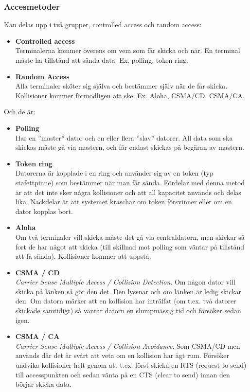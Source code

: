 \documentclass[11pt]{article}
\begin{document}
\subsubsection{Accesmetoder}
Kan delas upp i två grupper, controlled access och random access:
\begin{itemize}
\item{\textbf{Controlled access} \\
	Terminalerna kommer överens om vem som får skicka och när. En terminal måste ha tillstånd att sända data. Ex. polling, token ring.}
\item{\textbf{Random Access} \\
	Alla terminaler sköter sig själva och bestämmer själv när de får skicka. Kollisioner kommer förmodligen att ske. Ex. Aloha, CSMA/CD, CSMA/CA.}
\end{itemize}
Och de är:
\begin{itemize}
\item{\textbf{Polling} \\
	Har en ''master'' dator och en eller flera ''slav'' datorer. All data som ska skickas måste gå via mastern, och får endast skickas på begäran av mastern.}
\item{\textbf{Token ring} \\
	Datorerna är kopplade i en ring och använder sig av en token (typ stafettpinne) som bestämmer när man får sända. Fördelar med denna metod är att det inte sker några kollisioner och att all kapacitet används och delas lika. Nackdelar är att systemet kraschar om token försvinner eller om en dator kopplas bort.}
\item{\textbf{Aloha} \\
	Om två terminaler vill skicka måste det gå via centraldatorn, men skickar så fort de har något att skicka (till skillnad mot polling som väntar på tillstånd att få sända). Kollisioner kommer att uppstå.}
\item{\textbf{CSMA / CD} \\
	\emph{Carrier Sense Multiple Access / Collision Detection}. Om någon dator vill skicka på länken så gör den det. Den lyssnar och om länken är ledig skickar den. Om datorn märker att en kollision har inträffat (om t.ex. två datorer skickade samtidigt) så väntar datorn en slumpmässig tid och försöker sedan igen.}
\item{\textbf{CSMA / CA} \\
	\emph{Carrier Sense Multiple Access / Collision Avoidance}. Som CSMA/CD men används där det är svårt att veta om en kollision har ägt rum. Försöker undvika kollisioner helt genom att t.ex. först skicka en RTS (request to send) till accesspunkten och sedan vänta på en CTS (clear to send) innan den börjar skicka data.}
\end{itemize}
\end{document}
